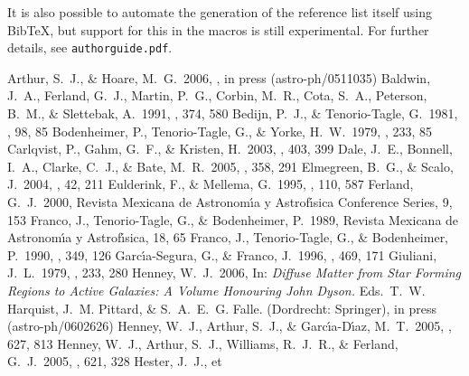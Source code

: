 \documentclass[debug]{rmaa}
\begin{document}
It is also possible to automate the generation of the reference list
itself using BibTeX, but support for this in the macros is still
experimental. For further details, see \texttt{authorguide.pdf}.


\begin{thebibliography}
 Arthur, S.~J., \&
Hoare, M.~G.\ 2006, \apj, in press (astro-ph/0511035)
 Baldwin, J.~A., 
Ferland, G.~J., Martin, P.~G., Corbin, M.~R., Cota, S.~A., Peterson, B.~M., 
\& Slettebak, A.\ 1991, \apj, 374, 580 
 Bedijn, P.~J., 
\& Tenorio-Tagle, G.\ 1981, \aap, 98, 85 
 Bodenheimer, P., 
Tenorio-Tagle, G., \& Yorke, H.~W.\ 1979, \apj, 233, 85 
 Carlqvist, P., Gahm, 
G.~F., \& Kristen, H.\ 2003, \aap, 403, 399 
 Dale, J.~E., Bonnell, 
I.~A., Clarke, C.~J., \& Bate, M.~R.\ 2005, \mnras, 358, 291 
 Elmegreen,
B.~G., \& Scalo, J.\ 2004, \araa, 42, 211 
 Eulderink, F., \& 
Mellema, G.\ 1995, \aaps, 110, 587 
 Ferland, G.~J.\ 2000, Revista 
Mexicana de Astronom\'\i{}a y Astrof\'\i{}sica Conference Series, 9, 153 
 Franco, J., 
Tenorio-Tagle, G., \& Bodenheimer, P.\ 1989, Revista Mexicana de
Astronom\'\i{}a y Astrof\'\i{}sica, 18, 65 
 Franco, J., 
Tenorio-Tagle, G., \& Bodenheimer, P.\ 1990, \apj, 349, 126 
  Garc\'\i a-Segura, G., \& Franco, J.\ 1996, \apj, 469, 171
 Giuliani, J.~L.\ 1979,
\apj, 233, 280 
 Henney, W.~J.\ 2006, In:
  \textit{Diffuse Matter from Star Forming Regions to Active Galaxies:
    A Volume Honouring John Dyson.} Eds.\ T.~W. Harquist,
  J.~M. Pittard, \& S.~A.~E.~G. Falle. (Dordrecht: Springer), in press
  (astro-ph/0602626)
  Henney, W.~J.,
Arthur, S.~J., \& Garc{\'{\i}}a-D{\'{\i}}az, M.~T.\ 2005, \apj, 627, 813 
 Henney, W.~J., Arthur, 
S.~J., Williams, R.~J.~R., \& Ferland, G.~J.\ 2005, \apj, 621, 328 
 Hester, J.~J., et

\end{thebibliography}
\end{document}
